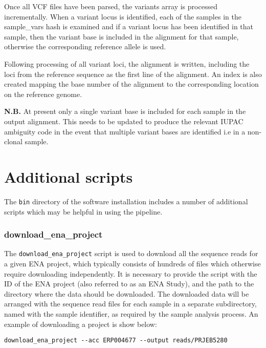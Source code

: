 \documentclass[a4paper,10pt,twoside]{article}
\begin{document}
Once all VCF files have been parsed, the variants array is processed
incrementally. When a variant locus is identified, each of the samples in the
sample\_vars hash is examined and if a variant locus has been identified in
that sample, then the variant base is included in the alignment for that
sample, otherwise the corresponding reference allele is used. 

Following processing of all variant loci, the alignment is written, including
the loci from the reference sequence as the first line of the alignment. An
index is also created mapping the base number of the alignment to the
corresponding location on the reference genome.

\textbf{N.B.} At present only a single variant base is included for each sample
in the output alignment. This needs to be updated to produce the relevant IUPAC
ambiguity code in the event that multiple variant bases are identified i.e in a
non-clonal sample. 

\section {Additional scripts}

The {\tt bin} directory of the software installation includes a number of
additional scripts which may be helpful in using the pipeline. 

\subsubsection {download\_ena\_project} 

The {\tt download\_ena\_project} script is used to download all the sequence
reads for a given ENA project, which typically consists of hundreds of files
which otherwise require downloading independently. It is necessary to provide
the script with the ID of the ENA project (also referred to as an ENA Study),
and the path to the directory where the data should be downloaded. The
downloaded data will be arranged with the sequence read files for each sample
in a separate subdirectory, named with the sample identifier, as required by
the sample analysis process. An example of downloading a project is show below:

\begin{verbatim}
download_ena_project --acc ERP004677 --output reads/PRJEB5280
\end{verbatim}
\end{document}
